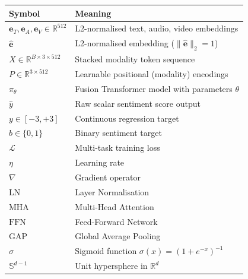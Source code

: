 \documentclass[12pt,a4paper]{article}
\theoremstyle{definition}
\begin{document}
\begin{center}
\begin{tabular}{ll}
\toprule
\textbf{Symbol} & \textbf{Meaning} \\
\midrule
$\mathbf{e}_T, \mathbf{e}_A, \mathbf{e}_V \in \mathbb{R}^{512}$ & L2-normalised text, audio, video embeddings \\
$\hat{\mathbf{e}}$ & L2-normalised embedding ($\|\hat{\mathbf{e}}\|_2 = 1$) \\
$X \in \mathbb{R}^{B \times 3 \times 512}$ & Stacked modality token sequence \\
$P \in \mathbb{R}^{3 \times 512}$ & Learnable positional (modality) encodings \\
$\pi_\theta$ & Fusion Transformer model with parameters $\theta$ \\
$\hat{y}$ & Raw scalar sentiment score output \\
$y \in [-3, +3]$ & Continuous regression target \\
$b \in \{0,1\}$ & Binary sentiment target \\
$\mathcal{L}$ & Multi-task training loss \\
$\eta$ & Learning rate \\
$\nabla$ & Gradient operator \\
$\text{LN}$ & Layer Normalisation \\
$\text{MHA}$ & Multi-Head Attention \\
$\text{FFN}$ & Feed-Forward Network \\
$\text{GAP}$ & Global Average Pooling \\
$\sigma$ & Sigmoid function $\sigma(x) = (1+e^{-x})^{-1}$ \\
$\mathbb{S}^{d-1}$ & Unit hypersphere in $\mathbb{R}^d$ \\
\bottomrule
\end{tabular}
\end{center}
\end{document}
